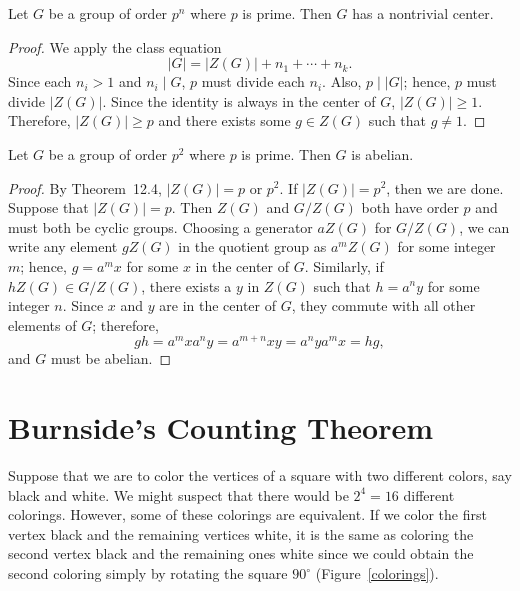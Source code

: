  
\begin{theorem}
Let $G$ be a group of order $p^n$ where $p$ is prime. Then $G$ has a
nontrivial center. 
\end{theorem}
 
 
\begin{proof}
We apply the class equation
$$
|G| = |Z(G)|  + n_1 + \cdots + n_k.
$$
Since each $n_i>1$ and $n_i \mid G$, $p$  must divide each $n_i$.
Also, $p \mid |G|$; hence, $p$ must divide $|Z(G)|$. Since the
identity is always in the center of $G$, $|Z(G)| \geq 1$. Therefore,
$|Z(G)|  \geq p$ and there exists some $g \in Z(G)$ such that $g \neq
1$. 
\mbox{\hspace*{1in}} 
\end{proof}
 
 
\begin{corollary}
Let $G$ be a group of order $p^2$ where $p$ is prime. Then $G$ is
abelian. 
\end{corollary}
 
 
\begin{proof}
By Theorem~12.4, $|Z(G)| = p$ or $p^2$.  If $|Z(G)| = p^2$, then
we are done.  Suppose that $|Z(G)| = p$. Then $Z(G)$ and $G / Z(G)$
both have order $p$ and must both be cyclic groups.  Choosing  a
generator $aZ(G)$ for $G / Z(G)$, we can write any element $gZ(G)$ in
the quotient group as $a^m Z(G)$ for some integer $m$; hence, $g = a^m
x$ for some $x$ in the center of $G$.  Similarly, if $hZ(G) \in G /
Z(G)$, there exists a $y$ in $Z(G)$ such that $h = a^n y$ for some
integer $n$.  Since $x$ and $y$ are in the center of $G$, they commute
with all other elements of $G$; therefore, 
$$
gh  =  a^m x a^n y =  a^{m+n} x y = a^n y a^m x = hg,
$$
and $G$ must be abelian.
\end{proof}
 
 
 
\section{Burnside's Counting Theorem}
 
 
 
Suppose that we are to color the vertices of a square with two
different colors, say black and white.  We might suspect that there
would be $2^4=16$ different colorings. However, some of these
colorings are equivalent.  If we color the first vertex black and the
remaining vertices white, it is the same as coloring the second vertex
black and the remaining ones white since we could obtain the second
coloring simply by rotating the square $90^\circ$
(Figure~\ref{colorings}). 
 
